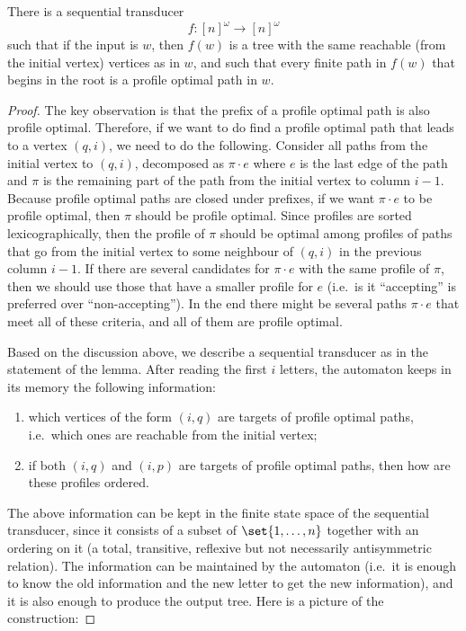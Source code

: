 \begin{lemma}\label{lem:optimise-dag}
 There is a sequential transducer $$f : [n]^\omega \to [n]^\omega$$ such that if the input is $w$, then $f(w)$ is a tree with the same reachable (from the initial vertex) vertices as in $w$, and such that every finite path in $f(w)$ that  begins in the root is a profile optimal path in $w$. 
\end{lemma}
\begin{proof} The key observation is that the prefix of a profile optimal path is also profile optimal. Therefore, if we want to do find a profile optimal path that leads to a vertex $(q,i)$, we need to do the following.  Consider all paths from the initial vertex to $(q,i)$, decomposed as $\pi \cdot e$ where $e$ is the last edge of the path and $\pi$ is the remaining part of the path from the initial vertex to column $i-1$. Because profile optimal paths are closed under prefixes, if we want $\pi \cdot e$ to be profile optimal, then $\pi$ should be profile optimal. Since profiles are sorted lexicographically, then the profile of $\pi$ should be optimal among profiles of paths that go from the initial vertex to some neighbour of $(q,i)$ in the previous column $i-1$. If there are several candidates for $\pi \cdot e$ with the same profile of $\pi$, then we should use those that have a smaller profile for $e$ (i.e.~is it ``accepting'' is preferred over ``non-accepting''). In the end there might be several paths $\pi \cdot e$ that meet all of these criteria, and all of them are profile optimal. 


Based on the discussion above, we describe a sequential transducer as in the statement of the lemma. After reading  the first $i$ letters, the automaton keeps in its memory the following information:
\begin{enumerate}
	\item which vertices of the form $(i,q)$ are targets of profile optimal paths, i.e.~which ones are reachable from the initial vertex;
	\item if both $(i,q)$ and $(i,p)$ are targets of profile optimal paths, then how are these profiles ordered.
\end{enumerate}
The above information can be kept in the finite state space of the sequential transducer, since it consists of a subset of $\set{1,\ldots,n}$ together with an ordering on it (a total, transitive, reflexive but not necessarily antisymmetric relation). The  information can be maintained by the automaton (i.e.~it is enough to know the old information and the new letter to get the new information), and it is also enough to produce the output tree.  Here is a picture of the construction:
\end{proof}

